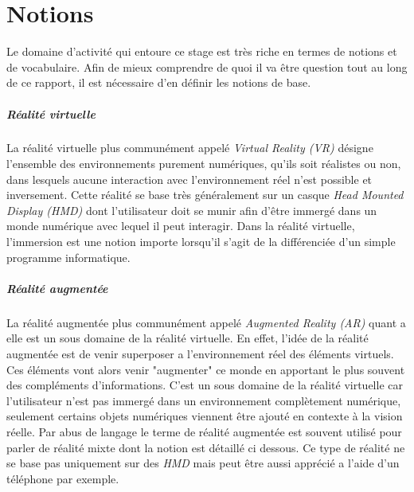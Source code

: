 \newpage
\chapter{Notions}
\label{chap:notions}

Le domaine d'activité qui entoure ce stage est très riche en termes de notions et de vocabulaire. Afin de mieux comprendre de quoi il va être question tout au long de ce rapport, il est nécessaire d'en définir les notions de base.

\paragraph{Réalité virtuelle}
La réalité virtuelle plus communément appelé \emph{Virtual Reality (VR)} désigne l'ensemble des environnements purement numériques, qu'ils soit réalistes ou non, dans lesquels aucune interaction avec l'environnement réel n'est possible et inversement. Cette réalité se base très généralement sur un casque \emph{Head Mounted Display (HMD)} dont l'utilisateur doit se munir afin d'être immergé dans un monde numérique avec lequel il peut interagir. Dans la réalité virtuelle, l'immersion est une notion importe lorsqu'il s'agit de la différenciée d'un simple programme informatique.


\paragraph{Réalité augmentée}
La réalité augmentée plus communément appelé \emph{Augmented Reality (AR)} quant a elle est un sous domaine de la réalité virtuelle. En effet, l'idée de la réalité augmentée est de venir superposer a l'environnement réel des éléments virtuels. Ces éléments vont alors venir "augmenter" ce monde en apportant le plus souvent des compléments d'informations. C'est un sous domaine de la réalité virtuelle car l'utilisateur n'est pas immergé dans un environnement complètement numérique, seulement certains objets numériques viennent être ajouté en contexte à la vision réelle. Par abus de langage le terme de réalité augmentée est souvent utilisé pour parler de réalité mixte dont la notion est détaillé ci dessous.
Ce type de réalité ne se base pas uniquement sur des \emph{HMD} mais peut être aussi apprécié a l'aide d'un téléphone par exemple.

